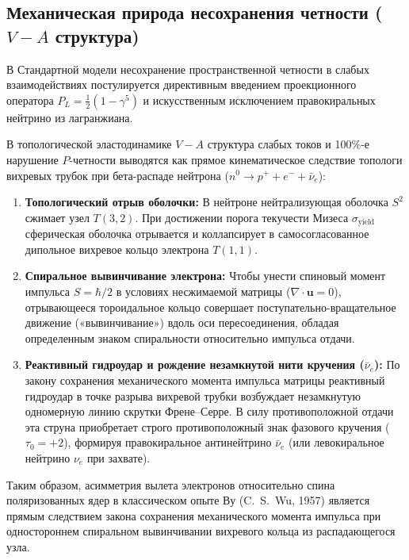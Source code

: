 \documentclass[11pt,a4paper]{article}
\theoremstyle{definition}
\theoremstyle{remark}
\begin{document}
\subsection{Механическая природа несохранения четности ($V-A$ структура)}
В Стандартной модели несохранение пространственной четности в слабых взаимодействиях постулируется директивным введением проекционного оператора $P_L = \frac{1}{2}(1 - \gamma^5)$ и искусственным исключением правокиральных нейтрино из лагранжиана. 

В топологической эластодинамике $V-A$ структура слабых токов и 100\%-е нарушение $P$-четности выводятся как прямое кинематическое следствие топологи вихревых трубок при бета-распаде нейтрона ($n^0 \to p^+ + e^- + \bar{\nu}_e$):

\begin{enumerate}
    \item \textbf{Топологический отрыв оболочки:} В нейтроне нейтрализующая оболочка $S^2$ сжимает узел $T(3,2)$. При достижении порога текучести Мизеса $\sigma_{\mathrm{yield}}$ сферическая оболочка отрывается и коллапсирует в самосогласованное дипольное вихревое кольцо электрона $T(1,1)$.
    
    \item \textbf{Спиральное вывинчивание электрона:} Чтобы унести спиновый момент импульса $S = \hbar/2$ в условиях несжимаемой матрицы ($\nabla \cdot \mathbf{u} = 0$), отрывающееся тороидальное кольцо совершает поступательно-вращательное движение («вывинчивание») вдоль оси пересоединения, обладая определенным знаком спиральности относительно импульса отдачи.
    
    \item \textbf{Реактивный гидроудар и рождение незамкнутой нити кручения ($\bar{\nu}_e$):} По закону сохранения механического момента импульса матрицы реактивный гидроудар в точке разрыва вихревой трубки возбуждает незамкнутую одномерную линию скрутки Френе--Серре. В силу противоположной отдачи эта струна приобретает строго противоположный знак фазового кручения ($\tau_0 = +2$), формируя правокиральное антинейтрино $\bar{\nu}_e$ (или левокиральное нейтрино $\nu_e$ при захвате).
\end{enumerate}

Таким образом, асимметрия вылета электронов относительно спина поляризованных ядер в классическом опыте Ву (C.~S.~Wu, 1957) является прямым следствием закона сохранения механического момента импульса при одностороннем спиральном вывинчивании вихревого кольца из распадающегося узла.
\end{document}
